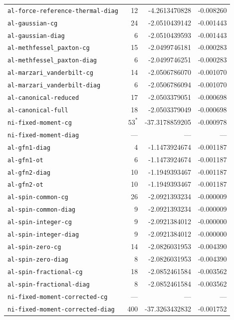 \begin{longtable}{p{0.53\linewidth}rrr}
\nolinkurl{al-force-reference-thermal-diag} & 12 & -4.2613470828 & -0.008260\\
\nolinkurl{al-gaussian-cg} & 24 & -2.0510439142 & -0.001443\\
\nolinkurl{al-gaussian-diag} & 6 & -2.0510439593 & -0.001443\\
\nolinkurl{al-methfessel_paxton-cg} & 15 & -2.0499746181 & -0.000283\\
\nolinkurl{al-methfessel_paxton-diag} & 6 & -2.0499746251 & -0.000283\\
\nolinkurl{al-marzari_vanderbilt-cg} & 14 & -2.0506786070 & -0.001070\\
\nolinkurl{al-marzari_vanderbilt-diag} & 6 & -2.0506786094 & -0.001070\\
\nolinkurl{al-canonical-reduced} & 17 & -2.0503379051 & -0.000698\\
\nolinkurl{al-canonical-full} & 18 & -2.0503379049 & -0.000698\\
\nolinkurl{ni-fixed-moment-cg} & $53^{*}$ & -37.3178859205 & -0.000978\\
\nolinkurl{ni-fixed-moment-diag} & --- & --- & ---\\
\nolinkurl{al-gfn1-diag} & 4 & -1.1473924674 & -0.001187\\
\nolinkurl{al-gfn1-ot} & 6 & -1.1473924674 & -0.001187\\
\nolinkurl{al-gfn2-diag} & 10 & -1.1949393467 & -0.001187\\
\nolinkurl{al-gfn2-ot} & 10 & -1.1949393467 & -0.001187\\
\nolinkurl{al-spin-common-cg} & 26 & -2.0921393234 & -0.000009\\
\nolinkurl{al-spin-common-diag} & 9 & -2.0921393234 & -0.000009\\
\nolinkurl{al-spin-integer-cg} & 9 & -2.0921384012 & -0.000000\\
\nolinkurl{al-spin-integer-diag} & 9 & -2.0921384012 & -0.000000\\
\nolinkurl{al-spin-zero-cg} & 14 & -2.0826031953 & -0.004390\\
\nolinkurl{al-spin-zero-diag} & 8 & -2.0826031953 & -0.004390\\
\nolinkurl{al-spin-fractional-cg} & 18 & -2.0852461584 & -0.003562\\
\nolinkurl{al-spin-fractional-diag} & 8 & -2.0852461584 & -0.003562\\
\nolinkurl{ni-fixed-moment-corrected-cg} & --- & --- & ---\\
\nolinkurl{ni-fixed-moment-corrected-diag} & 400 & -37.3263432832 & -0.001752\\

\end{longtable}
